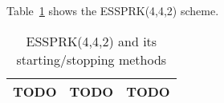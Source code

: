 Table~\ref{tab:essprk442} shows the ESSPRK(4,4,2) scheme.

\begin{table}
  \caption{ESSPRK(4,4,2) and its starting/stopping methods}
  \label{tab:essprk442}
  \centering
  \begin{tabular}{|c|c|c|}
    \hline
    TODO & TODO & TODO \\
    \hline
  \end{tabular}
\end{table}


















